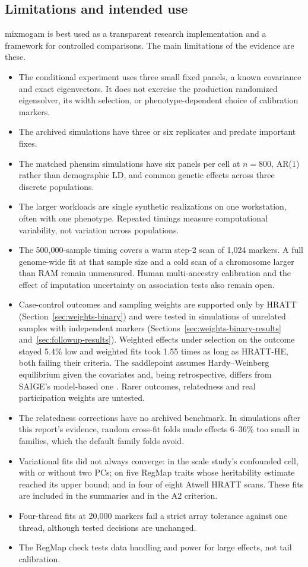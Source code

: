 \documentclass[11pt]{article}
\begin{document}
\subsection{Limitations and intended use}

mixmogam is best used as a transparent research implementation and a
framework for controlled comparisons. The main limitations of the
evidence are these.
\begin{itemize}
 \item The conditional experiment uses three small fixed panels, a known
 covariance and exact eigenvectors. It does not exercise the production
 randomized eigensolver, its width selection, or phenotype-dependent
 choice of calibration markers.
 \item The archived simulations have three or six replicates and predate
 important fixes.
 \item The matched phensim simulations have six panels per cell at
 $n=800$, AR(1) rather than demographic LD, and common genetic effects
 across three discrete populations.
 \item The larger workloads are single synthetic realizations on one
 workstation, often with one phenotype. Repeated timings measure
 computational variability, not variation across populations.
 \item The 500,000-sample timing covers a warm step-2 scan of 1,024 markers.
 A full genome-wide fit at that sample size and a cold scan of a chromosome
 larger than RAM remain unmeasured. Human multi-ancestry calibration and
 the effect of imputation uncertainty on association tests also remain open.
 \item Case-control outcomes and sampling weights are supported only by
 HRATT (Section~\ref{sec:weights-binary}) and were tested in simulations
 of unrelated samples with independent markers
 (Sections~\ref{sec:weights-binary-results} and~\ref{sec:followup-results}).
 Weighted effects under selection on the outcome stayed 5.4\% low and
 weighted fits took 1.55 times as long as HRATT-HE, both failing their
 criteria. The saddlepoint assumes Hardy--Weinberg equilibrium given the
 covariates and, being retrospective, differs from SAIGE's model-based
 one \citep{zhou2018}. Rarer outcomes, relatedness and real participation
 weights are untested.
 \item The relatedness corrections have no archived benchmark. In
 simulations after this report's evidence, random cross-fit folds made
 effects 6--36\% too small in families, which the default family folds
 avoid.
 \item Variational fits did not always converge: in the scale study's
 confounded cell, with or without two PCs; on five RegMap traits whose
 heritability estimate reached its upper bound; and in four of eight Atwell
 HRATT scans. These fits
 are included in the summaries and in the A2 criterion.
 \item Four-thread fits at 20,000 markers fail a strict array tolerance
 against one thread, although tested decisions are unchanged.
 \item The RegMap check tests data handling and power for large effects,
 not tail calibration.
\end{itemize}
\end{document}
